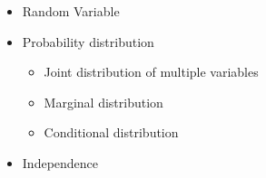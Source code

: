 \begin{resume}
\begin{itemize}
    \item Random Variable
    \item Probability distribution
    \begin{itemize}
        \item Joint distribution of multiple variables
        \item Marginal distribution
        \item Conditional distribution
    \end{itemize}
    \item Independence
\end{itemize}    
\end{resume}
